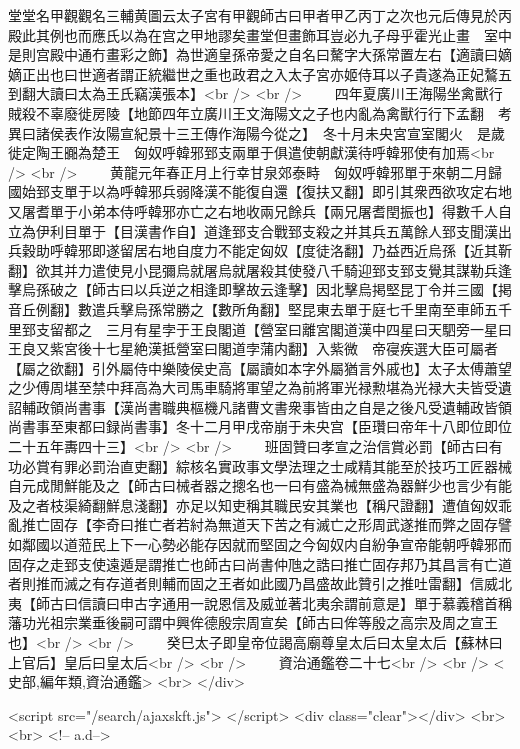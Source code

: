 堂堂名甲觀觀名三輔黄圖云太子宮有甲觀師古曰甲者甲乙丙丁之次也元后傳見於丙殿此其例也而應氏以為在宫之甲地謬矣畫堂但畫飾耳豈必九子母乎霍光止畫　室中是則宫殿中通冇畫彩之飾】為世適皇孫帝愛之自名曰驁字大孫常置左右【適讀曰嫡嫡正出也曰世適者謂正統繼世之重也政君之入太子宮亦姬侍耳以子貴遂為正妃鷔五到翻大讀曰太為王氏竊漢張本】<br />
<br />
　　四年夏廣川王海陽坐禽獸行賊殺不辜廢徙房陵【地節四年立廣川王文海陽文之子也内亂為禽獸行行下孟翻　考異曰諸侯表作汝陽宣紀景十三王傳作海陽今從之】　冬十月未央宮宣室閣火　是歲徙定陶王嚻為楚王　匈奴呼韓邪郅支兩單于俱遣使朝獻漢待呼韓邪使有加焉<br />
<br />
　　黄龍元年春正月上行幸甘泉郊泰畤　匈奴呼韓邪單于來朝二月歸國始郅支單于以為呼韓邪兵弱降漢不能復自還【復扶又翻】即引其衆西欲攻定右地又屠耆單于小弟本侍呼韓邪亦亡之右地收兩兄餘兵【兩兄屠耆閏振也】得數千人自立為伊利目單于【目漢書作自】道逢郅支合戰郅支殺之并其兵五萬餘人郅支聞漢出兵穀助呼韓邪即遂留居右地自度力不能定匈奴【度徒洛翻】乃益西近烏孫【近其靳翻】欲其并力遣使見小昆彌烏就屠烏就屠殺其使發八千騎迎郅支郅支覺其謀勒兵逢擊烏孫破之【師古曰以兵逆之相逢即擊故云逢擊】因北擊烏掲堅昆丁令并三國【掲音丘例翻】數遣兵擊烏孫常勝之【數所角翻】堅昆東去單于庭七千里南至車師五千里郅支留都之　三月有星孛于王良閣道【營室曰離宮閣道漢中四星曰天駟旁一星曰王良又紫宮後十七星絶漢抵營室曰閣道孛蒲内翻】入紫微　帝寑疾選大臣可屬者【屬之欲翻】引外屬侍中樂陵侯史高【屬讀如本字外屬猶言外戚也】太子太傅蕭望之少傅周堪至禁中拜高為大司馬車騎將軍望之為前將軍光禄勲堪為光禄大夫皆受遺詔輔政領尚書事【漢尚書職典樞機凡諸曹文書衆事皆由之自是之後凡受遺輔政皆領尚書事至東都曰録尚書事】冬十二月甲戌帝崩于未央宫【臣瓚曰帝年十八即位即位二十五年夀四十三】<br />
<br />
　　班固贊曰孝宣之治信賞必罰【師古曰有功必賞有罪必罰治直吏翻】綜核名實政事文學法理之士咸精其能至於技巧工匠器械自元成閒鮮能及之【師古曰械者器之摠名也一曰有盛為械無盛為器鮮少也言少有能及之者枝渠綺翻鮮息淺翻】亦足以知吏稱其職民安其業也【稱尺證翻】遭值匈奴乖亂推亡固存【李奇曰推亡者若紂為無道天下苦之有滅亡之形周武遂推而弊之固存譬如鄰國以道蒞民上下一心勢必能存因就而堅固之今匈奴内自紛争宣帝能朝呼韓邪而固存之走郅支使遠遁是謂推亡也師古曰尚書仲虺之誥曰推亡固存邦乃其昌言有亡道者則推而滅之有存道者則輔而固之王者如此國乃昌盛故此贊引之推吐雷翻】信威北夷【師古曰信讀曰申古字通用一說恩信及威並著北夷余謂前意是】單于慕義稽首稱藩功光祖宗業垂後嗣可謂中興侔德殷宗周宣矣【師古曰侔等殷之高宗及周之宣王也】<br />
<br />
　　癸巳太子即皇帝位謁高廟尊皇太后曰太皇太后【蘇林曰上官后】皇后曰皇太后<br />
<br />
　　資治通鑑卷二十七<br />
<br />
<史部,編年類,資治通鑑>  <br>
   </div> 

<script src="/search/ajaxskft.js"> </script>
 <div class="clear"></div>
<br>
<br>
 <!-- a.d-->

